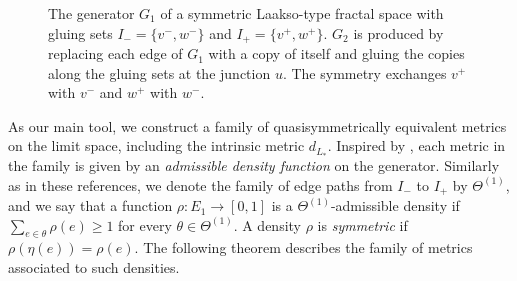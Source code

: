 \documentclass{amsart}
\numberwithin{equation}{section}
\theoremstyle{definition}
\theoremstyle{remark}
\begin{document}
\begin{figure}[!ht]
    \caption{The generator \(G_1\) of a symmetric Laakso-type fractal space with gluing sets \(I_-=\{v^-,w^-\}\) and \(I_+=\{v^+,w^+\}\). \(G_2\) is produced by replacing each edge of \(G_1\) with a copy of itself and gluing the copies along the gluing sets at the junction \(u\). The symmetry exchanges \(v^+\) with \(v^-\) and \(w^+\) with \(w^-\).}
    \label{fig:placeholder1}
    \end{figure}

As our main tool, we construct a family of quasisymmetrically equivalent metrics on the limit space, including the intrinsic metric \(d_{L_*}\). Inspired by \cite{Carrasco, KeithLD,Kigamiweighted}, each metric in the family is given by an \emph{admissible density function} on the generator. Similarly as in these references, we denote the family of edge paths from \(I_-\) to \(I_+\) by \(\Theta^{(1)}\), and we say that a function \(\rho\colon E_1\to [0,1]\) is a \(\Theta^{(1)}\)-admissible density if \(\sum_{e\in \theta}\rho(e) \geq 1\) for every \(\theta\in\Theta^{(1)}\). A density \(\rho\) is \emph{symmetric} if \(\rho(\eta(e))=\rho(e)\). The following theorem describes the family of metrics associated to such densities.
 
\end{document}
